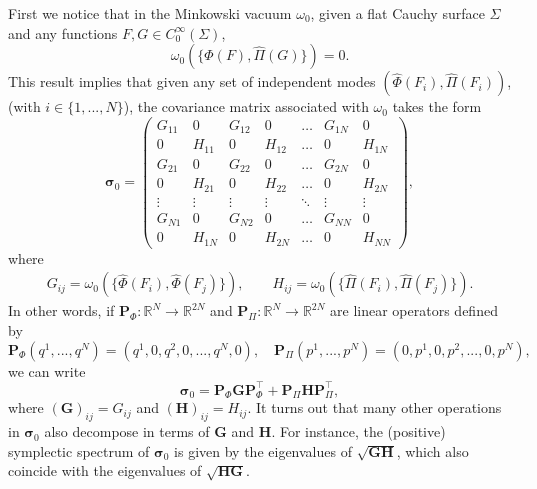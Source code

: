 \documentclass[letterpaper,12pt,titlepage,oneside,final]{book}
\begin{document}
First we notice that in the Minkowski vacuum $\omega_0$, given a flat Cauchy surface $\Sigma$ and any functions $F,G\in C_0^\infty(\Sigma)$,
\begin{equation}
    \omega_0(\{\hat{\Phi}(F),\hat{\Pi}(G)\}) = 0.
\end{equation}
This result implies that given any set of independent modes $(\hat{\Phi}(F_{i}),\hat{\Pi}(F_{i}))$, (with $i\in\{1,...,N\}$), the covariance matrix associated with $\omega_0$ takes the form
\begin{equation}\label{eq:sigma0}
    \bm  \sigma_{0} = \begin{pmatrix}G_{11} & 0 & G_{12} & 0 & \dots & G_{1N} & 0\\
    0 & H_{11} & 0 & H_{12} & \dots & 0 & H_{1N}\\
    G_{21} & 0 & G_{22} & 0 & \dots & G_{2N} & 0\\
    0 & H_{21} & 0 & H_{22} & \dots & 0 & H_{2N}\\
    \vdots & \vdots & \vdots & \vdots &\ddots & \vdots  & \vdots\\
    G_{N1} & 0 & G_{N2} & 0 & \dots & G_{NN} & 0\\
    0 & H_{1N} & 0 & H_{2N} & \dots & 0 & H_{NN}
    \end{pmatrix},
\end{equation}
where
\begin{align}\label{eq:GijHij}
    G_{ij} = \omega_0(\{\hat{\Phi}(F_i),\hat{\Phi}(F_j)\}),\quad \quad H_{ij} = \omega_0(\{\hat{\Pi}(F_i),\hat{\Pi}(F_j)\}).
\end{align}
In other words, if $\bm P_\Phi: \mathbb{R}^{N}\to \mathbb{R}^{2N}$ and $\bm P_\Pi: \mathbb{R}^{N}\to \mathbb{R}^{2N}$ are linear operators defined by
\begin{equation}\label{eq:PPhiPPi}
    \bm P_\Phi(q^1,...,q^N) = (q^1,0,q^2,0,...,q^N,0), \quad
    \bm P_\Pi(p^1,...,p^N) = (0,p^1,0,p^2,...,0,p^N),
\end{equation}
we can write
\begin{equation}
    \bm \sigma_0 = \bm P_\Phi \bm G \bm P_\Phi^\intercal + \bm P_\Pi \bm H \bm P_\Pi^\intercal,
\end{equation}
where $(\bm G)_{ij} = G_{ij}$ and $(\bm H)_{ij}=  H_{ij}$. It turns out that many other operations in $\bm \sigma_0$ also decompose in terms of $\bm G$ and $\bm H$. For instance, the (positive) symplectic spectrum of $\bm \sigma_0$ is given by the eigenvalues of $\sqrt{\bm G \bm H}$, which also coincide with the eigenvalues of $\sqrt{\bm H\bm G}$. 
\end{document}
